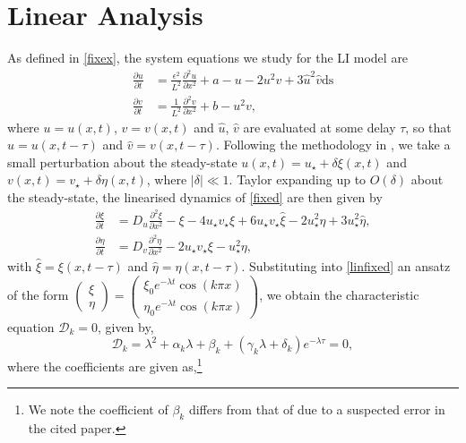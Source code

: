 \section{Linear Analysis}
As defined in \eqref{fixex}, the system equations we study for the LI model are
\begin{equation}\label{fixed}
  \begin{split}
  \frac{\partial u}{\partial t}&=\frac{\epsilon^2}{L^2}\frac{\partial^2u}{\partial x^2}+a-u-2u^2v+3\hat{u}^2\hat{v} \text{ds}\\
  \frac{\partial v}{\partial t}&=\frac{1}{L^2}\frac{\partial^2v}{\partial x^2}+b-u^2v,
\end{split}
\end{equation}
where $u=u(x,t)$, $v=v(x,t)$ and $\hat{u}$, $\hat{v}$ are evaluated at some delay $\tau$, so that $\hat{u}=u(x,t-\tau)$ and $\hat{v}=v(x,t-\tau)$. Following the methodology in \cite{yigaffneyli}, we take a small perturbation about the steady-state $u(x,t)=u_\star+\delta\xi(x,t)$ and $v(x,t)=v_\star+\delta\eta(x,t)$, where $|\delta|\ll 1$. Taylor expanding up to $O(\delta)$ about the steady-state, the linearised dynamics of \eqref{fixed} are then given by
\begin{equation}\label{linfixed}
  \begin{split}
\frac{\partial\xi}{\partial t}&=D_u\frac{\partial^2\xi}{\partial x^2}-\xi-4u_\star v_\star\xi+6u_\star v_\star\hat{\xi}-2u_\star^2\eta+3u_\star^2\hat{\eta},\\
\frac{\partial\eta}{\partial t}&=D_v\frac{\partial^2\eta}{\partial x^2}-2u_\star v_\star\xi-u_\star^2\eta,
\end{split}
\end{equation}
with $\hat{\xi}=\xi(x,t-\tau)$ and $\hat{\eta}=\eta(x,t-\tau)$. Substituting into \eqref{linfixed} an ansatz of the form $\begin{pmatrix}\xi\\\eta\end{pmatrix}=\begin{pmatrix}\xi_0e^{-\lambda t}\cos(k\pi x)\\ \eta_0e^{-\lambda t}\cos(k\pi x)\end{pmatrix}$, we obtain the characteristic equation $\mathcal{D}_k=0$, given by,
\begin{equation}\label{characfix}
\mathcal{D}_k=\lambda^2+\alpha_k\lambda+\beta_k+(\gamma_k\lambda+\delta_k)e^{-\lambda\tau}=0,
\end{equation}
where the coefficients are given as,\footnote{We note the coefficient of $\beta_k$ differs from that of \cite{yigaffneyli} due to a suspected error in the cited paper.}
